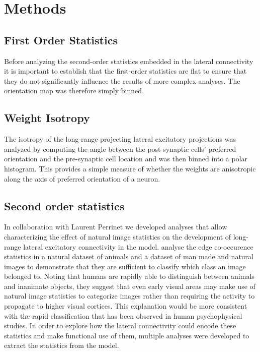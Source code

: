 \section{Methods}

\subsection{First Order Statistics}

Before analyzing the second-order statistics embedded in the lateral
connectivity it is important to establish that the first-order
statistics are flat to ensure that they do not significantly influence
the results of more complex analyses. The orientation map was
therefore simply binned.

\subsection{Weight Isotropy}

The isotropy of the long-range projecting lateral excitatory
projections was analyzed by computing the angle between the
post-synaptic cells' preferred orientation and the pre-synaptic cell
location and was then binned into a polar histogram. This provides a
simple measure of whether the weights are anisotropic along the axis
of preferred orientation of a neuron.

\subsection{Second order statistics}

In collaboration with Laurent Perrinet we developed analyses that
allow characterizing the effect of natural image statistics on the
development of long-range lateral excitatory connectivity in the
model. \cite{Perrinet2015} analyse the edge co-occurence statistics in
a natural dataset of animals and a dataset of man made and natural
images to demonstrate that they are sufficient to classify which class
an image belonged to. Noting that humans are rapidly able to
distinguish between animals and inanimate objects, they suggest that
even early visual areas may make use of natural image statistics to
categorize images rather than requiring the activity to propagate to
higher visual cortices. This explanation would be more consistent with
the rapid classification that has been observed in human
psychophysical studies. In order to explore how the lateral
connectivity could encode these statistics and make functional use of
them, multiple analyses were developed to extract the statistics from
the model.

